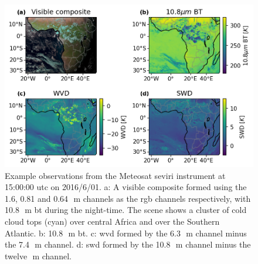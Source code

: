 \begin{figure}[tp]
    \includegraphics[width=\textwidth]{figures/ch3_01.png}
    \caption[
    Example observations from the Meteosat \acrshort{seviri} instrument at 15:00:00 \acrshort{utc} on 2016/6/01
    ]{
    Example observations from the Meteosat \acrshort{seviri} instrument at 15:00:00 \acrshort{utc} on 2016/6/01. a: A visible composite formed using the 1.6, 0.81 and 0.64\,\unit{\mu m} channels as the \acrshort{rgb} channels respectively, with 10.8\,\unit{\mu m} \acrshort{bt} during the night-time. The scene shows a cluster of cold cloud tops (cyan) over central Africa and over the Southern Atlantic. b: 10.8\,\unit{\mu m} \acrshort{bt}. c: \acrshort{wvd} formed by the 6.3\,\unit{\mu m} channel minus the 7.4\,\unit{\mu m} channel. d: \acrshort{swd} formed by the 10.8\,\unit{\mu m} channel minus the twelve\,\unit{\mu m} channel.
    }
    \label{fig:seviri_obs_example}
\end{figure}


